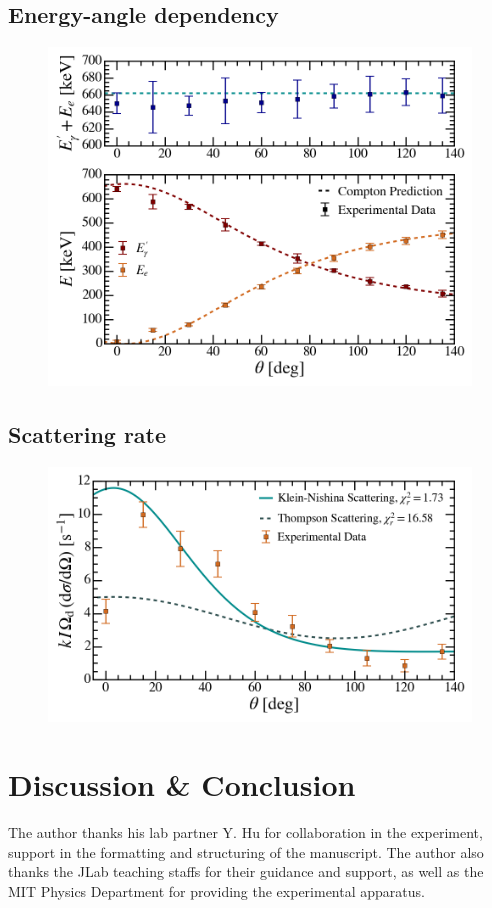 \documentclass[aps,twocolumn,secnumarabic,balancelastpage,amsmath,amssymb,nofootinbib,floatfix]{revtex4-1}
\begin{document}
\subsection{Energy-angle dependency}
\label{ssec:energy_angle_dependency}

\begin{figure}
    \centering
    \includegraphics[width=0.49 \textwidth]{Figures/energy_angle_dependency.png}
    \caption{}
    \label{fig:energy_angle_dependency}
\end{figure}



\subsection{Scattering rate}
\label{ssec:scattering_rate}

\begin{figure}
    \centering
    \includegraphics[width=0.49 \textwidth]{Figures/scattering_rate.png}
    \caption{}
    \label{fig:scattering_rate}
\end{figure}




\section{Discussion \& Conclusion}
\label{sec:conclusion}




\begin{acknowledgments}

The author thanks his lab partner  Y. Hu for collaboration in the experiment, support in the formatting and structuring of the manuscript. The author also thanks the JLab teaching staffs for their guidance and support, as well as the MIT Physics Department for providing the experimental apparatus.

\end{acknowledgments}
\end{document}
